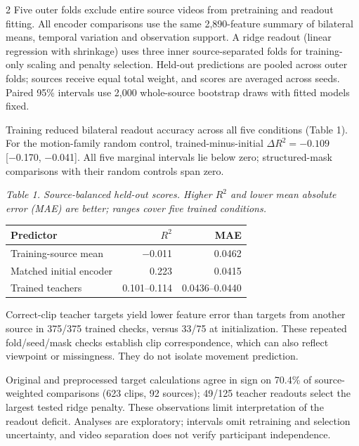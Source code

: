 \documentclass[11pt,letterpaper]{article}
\newcommand{\risexheading}[1]{\par\vspace{4pt}{\bfseries\underline{#1}}\par\nobreak\vspace{1pt}}
\begin{document}
\begin{multicols}{2}
Five outer folds exclude entire source videos from pretraining and
readout fitting. All encoder comparisons use the same 2,890-feature
summary of bilateral means, temporal variation and observation support.
A ridge readout (linear regression with shrinkage) uses three inner
source-separated folds for training-only scaling and penalty selection.
Held-out predictions are pooled across outer folds; sources receive
equal total weight, and scores are averaged across seeds. Paired 95\%
intervals use 2,000 whole-source bootstrap draws with fitted models
fixed.

\risexheading{RESULTS AND DISCUSSION}

Training reduced bilateral readout accuracy across all five conditions
(Table 1). For the motion-family random control, trained-minus-initial
\(\Delta R^2=-0.109\) {[}−0.170, −0.041{]}. All five marginal intervals
lie below zero; structured-mask comparisons with their random controls
span zero.

\begin{minipage}{\linewidth}
{\fontsize{9}{10.5}\selectfont \emph{Table 1. Source-balanced held-out scores. Higher \(R^2\) and lower
mean absolute error (MAE) are better; ranges cover five trained
conditions.}\par}
\vspace{3pt}

\setlength{\tabcolsep}{2pt}
\begin{tabularx}{\linewidth}{@{}>{\raggedright\arraybackslash}Xrr@{}}
\toprule
Predictor & \(R^2\) & MAE \\
\midrule
Training-source mean & −0.011 & 0.0462 \\
Matched initial encoder & 0.223 & 0.0415 \\
Trained teachers & 0.101--0.114 & 0.0436--0.0440 \\
\bottomrule
\end{tabularx}
\end{minipage}

Correct-clip teacher targets yield lower feature error than targets from
another source in 375/375 trained checks, versus 33/75 at
initialization. These repeated fold/seed/mask checks establish clip
correspondence, which can also reflect viewpoint or missingness. They do
not isolate movement prediction.

Original and preprocessed target calculations agree in sign on 70.4\% of
source-weighted comparisons (623 clips, 92 sources); 49/125 teacher
readouts select the largest tested ridge penalty. These observations
limit interpretation of the readout deficit. Analyses are exploratory;
intervals omit retraining and selection uncertainty, and video
separation does not verify participant independence.


\end{multicols}
\end{document}
